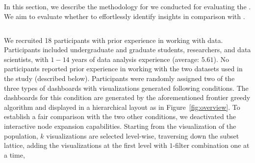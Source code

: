 In this section, we describe the methodology
for 
we conducted for evaluating the
.
We aim to evaluate whether to effortlessly identify insights in comparison
with .%
\subsection{}
We recruited 18 participants 
with prior experience in working with data.
Participants included undergraduate
and graduate students, researchers,
and data scientists, with $1-14$ years of data
analysis experience (average: $5.61$).
No participants reported prior experience
in working with the two datasets used in the study (described below).
Participants were randomly assigned two
of the three types of dashboards with 
visualizations generated 
following conditions. 
\stitle{\system:} The dashboards for this condition
are generated by the aforementioned
frontier greedy algorithm and displayed
in a hierarchical layout as in Figure~\ref{fig:overview}.
To establish a fair comparison
with the two other conditions,
we deactivated 
the interactive node expansion capabilities.
Starting from the visualization of the  population,
$k$ visualizations are selected level-wise,
traversing down the subset lattice,
adding the visualizations at the first level
with $1$-filter combination one at a time,
